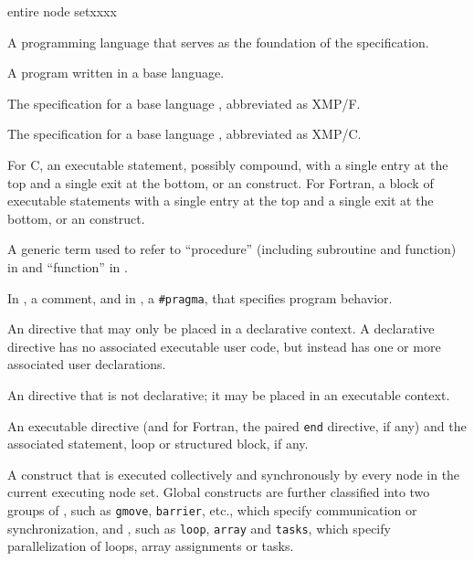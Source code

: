 \begin{namelist}{entire node setxxxx}


 A programming language that serves as the foundation of the {\XMP}
 specification.


 A program written in a base language.

\gitem{\XMPF}

 The {\XMP} specification for a base language {\Fort}, abbreviated as
 XMP/F.

\gitem{\XMPC}

 The {\XMP} specification for a base language {\C}, abbreviated as
 XMP/C.


 For C, an executable statement, possibly compound, with a single entry
 at the top and a single exit at the bottom, or an {\XMP} construct.
 For Fortran, a block of executable statements with a single entry at
 the top and a single exit at the bottom, or an {\XMP} construct.


 A generic term used to refer to ``procedure'' (including subroutine and
 function) in {\XMPF} and ``function'' in {\XMPC}.


 In {\XMPF}, a comment, and in {\XMPC}, a {\tt \#pragma}, that specifies
 {\XMP} program behavior.


 An {\XMP} directive that may only be placed in a declarative context. A
 declarative directive has no associated executable user code, but
 instead has one or more associated user declarations.


 An {\XMP} directive that is not declarative; it may be placed in an
 executable context.


 An {\XMP} executable directive (and for Fortran, the paired {\tt end}
 directive, if any) and the associated statement, loop or structured
 block, if any.



 A construct that is executed collectively and synchronously by every
 node in the current executing node set. Global constructs are further 
 classified into two groups of {\it {}}, such as {\tt gmove}, {\tt barrier}, etc., which specify
 communication or synchronization, and {\it {}}, such as {\tt loop}, {\tt array} and {\tt tasks}, which
 specify parallelization of loops, array assignments or tasks.


\end{namelist}

